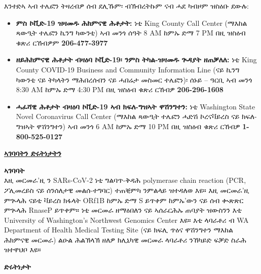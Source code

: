 \documentclass[10pt]{article}
\begin{document}
እንተድኣ ኣብ ተሌፎን ትዛረብዎ ሰብ ደሊኹም፡ ብኽብረትኩም ናብ ሓደ ካብዞም ዝስዕቡ ደውሉ:

\begin{itemize}

\item

  \textbf{ምስ ኮቪድ-19 ዝዛመዱ ሕክምናዊ ሕቶታት:} ነቲ King County Call Center (ማእከል
  ጻውዒት ተሌፎን ኪንግ ካውንቲ) ኣብ መንጎ ሰዓት 8 AM ከምኡ ድማ 7 PM በዚ ዝስዕብ ቁጽሪ ርኸብዎም
  \textbf{206-477-3977}

\item

  \textbf{ዘይሕክምናዊ ሕቶታት ብዛዕባ ኮቪድ-19፡ ንምስ ትካል-ዝዛመዱ ጒዳያት ዘጠቓለለ:} ነቲ King
  County COVID-19 Business and Community Information Line (ናይ ኪንግ ካውንቲ ናይ ትካላትን
  ማሕበረሰብን ናይ ሓበሬታ መስመር ተሌፎን)፡ ሰኑይ – ዓርቢ ኣብ መንጎ 8:30 AM ከምኡ ድማ 4:30 PM በዚ
  ዝስዕብ ቁጽሪ ርኸብዎ \textbf{206-296-1608}

\item

  \textbf{ሓፈሻዊ ሕቶታት ብዛዕባ ኮቪድ-19 ኣብ ክፍለ-ግዝኣት ዋሽንግተን:} ነቲ Washington State
  Novel Coronavirus Call Center (ማእከል ጻውዒት ተሌፎን ሓድሽ ኮረናቫይረስ ናይ ክፍለ-ግዝኣት
  ዋሽንግተን) ኣብ መንጎ 6 AM ከምኡ ድማ 10 PM በዚ ዝስዕብ ቁጽሪ ርኸብዎ \textbf{1-800-525-0127}

\end{itemize}

\bigskip

\large \underline{\textbf{ኣገባባትን ድሩትነታትን}}

\textbf{ኣገባባት}\\
እዚ መርመራ'ዚ ን SARs-CoV-2 ነቲ ግልባጥ-ቅዳሕ polymerase chain reaction (PCR, ፖሊመረይስ ናይ
ሰንሰለታዊ መልሰ-ተግባር) ተጠቒምካ ንምልላይ ዝተዳለወ እዩ። እዚ መርመራ'ዚ ምጒላሕ ናይቲ ቫይረስ ክፋላት ORf1B
ከምኡ ድማ S ይጥቀም ከምኡ'ውን ናይ ሰብ ቊጽጽር ምጒላሕ RnaseP ይጥቀም። ነቲ መርመራ ዘማዕበለን ናይ
ኣሰራርሕኡ ጠባያት ዝውስንን እቲ University of Washington’s Northwest Genomics Center እዩ።
እቲ ላባራቶሪ ብ WA Department of Health Medical Testing Site (ናይ ክፍሊ ጥዕና ዋሽንግተን
ማእከል ሕክምናዊ መርመራ) ልዑል ሕልኽላኽ ዘለዎ ክሊኒካዊ መርመራ ላባራቶሪ ንኸካይድ ፍቓድ ስራሕ ዝተዋህቦ እዩ።

\textbf{ድሩትነታት}
\end{document}
